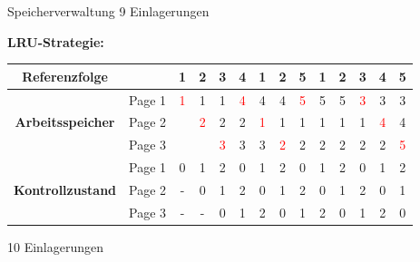 \begin{example}{Speicherverwaltung}
    9 Einlagerungen

    \textbf{LRU-Strategie:}

    \begin{tabular}{|c|c|c|c|c|c|c|c|c|c|c|c|c|c|}
        \hline
        \multicolumn{1}{|c}{\textbf{Referenzfolge}} & \multicolumn{1}{c|}{} & 1                  & 2                  & 3                  & 4                  & 1                  & 2                  & 5                  & 1 & 2 & 3                  & 4                  & 5                  \\
        \hline
        \hline
        \multirow{3}{*}{\textbf{Arbeitsspeicher}}   & Page 1                & \textcolor{red}{1} & 1                  & 1                  & \textcolor{red}{4} & 4                  & 4                  & \textcolor{red}{5} & 5 & 5 & \textcolor{red}{3} & 3                  & 3                  \\
                                                    & Page 2                &                    & \textcolor{red}{2} & 2                  & 2                  & \textcolor{red}{1} & 1                  & 1                  & 1 & 1 & 1                  & \textcolor{red}{4} & 4                  \\
                                                    & Page 3                &                    &                    & \textcolor{red}{3} & 3                  & 3                  & \textcolor{red}{2} & 2                  & 2 & 2 & 2                  & 2                  & \textcolor{red}{5} \\
        \hline
        \hline
        \multirow{3}{*}{\textbf{Kontrollzustand}}   & Page 1                & 0                  & 1                  & 2                  & 0                  & 1                  & 2                  & 0                  & 1 & 2 & 0                  & 1                  & 2                  \\
                                                    & Page 2                & -                  & 0                  & 1                  & 2                  & 0                  & 1                  & 2                  & 0 & 1 & 2                  & 0                  & 1                  \\
                                                    & Page 3                & -                  & -                  & 0                  & 1                  & 2                  & 0                  & 1                  & 2 & 0 & 1                  & 2                  & 0                  \\
        \hline
    \end{tabular}

    10 Einlagerungen
\end{example}


